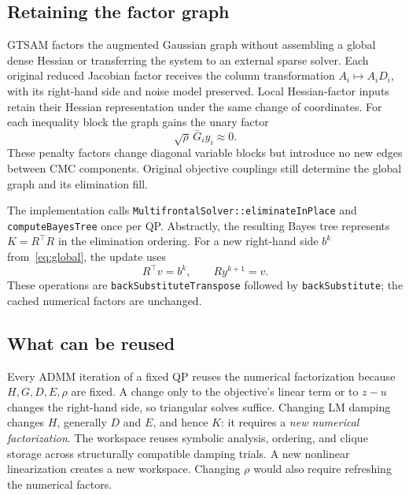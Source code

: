 \documentclass[11pt,letterpaper]{article}
\newcommand{\code}[1]{\texttt{\small #1}}
\begin{document}
\subsection{Retaining the factor graph}
GTSAM factors the augmented Gaussian graph without assembling a global dense
Hessian or transferring the system to an external sparse solver. Each original
reduced Jacobian factor receives the column transformation $A_i\mapsto A_iD_i$,
with its right-hand side and noise model preserved. Local Hessian-factor
inputs retain their Hessian representation under the same change of
coordinates. For each inequality block the graph gains the unary factor
\begin{equation}
  \sqrt\rho\,\bar G_i y_i\approx0.
\end{equation}
These penalty factors change diagonal variable blocks but introduce no
new edges between CMC components. Original objective couplings still
determine the global graph and its elimination fill.

The implementation calls \code{MultifrontalSolver::eliminateInPlace} and
\code{computeBayesTree} once per QP. Abstractly, the resulting Bayes tree
represents $K=R^\top R$ in the elimination ordering. For a new right-hand side
$b^k$ from~\eqref{eq:global}, the update uses
\begin{equation}
  R^\top v=b^k,\qquad R y^{k+1}=v.
\end{equation}
These operations are \code{backSubstituteTranspose} followed by
\code{backSubstitute}; the cached numerical factors are unchanged.

\subsection{What can be reused}
Every ADMM iteration of a fixed QP reuses the numerical factorization because
$H,G,D,E,\rho$ are fixed. A change only to the objective's linear term or to
$z-u$ changes the right-hand side, so triangular solves suffice. Changing LM
damping changes $H$, generally $D$ and $E$, and hence $K$: it requires a
\emph{new numerical factorization}. The workspace reuses symbolic analysis,
ordering, and clique storage across structurally compatible damping trials.
A new nonlinear linearization creates a new workspace. Changing $\rho$
would also require refreshing the numerical factors.

\newpage
\end{document}
